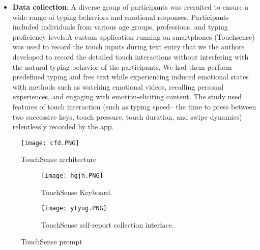 \documentclass[12pt]{article} %
\begin{document}
\begin{itemize}
    \item \textbf{Data collection}:
    A diverse group of participants was recruited to ensure a wide range of typing behaviors and emotional responses. Participants included individuals from various age groups, professions, and typing proficiency levels.A custom application running on smartphones (Touchsense) was used to record the touch inputs during text entry that we the authors developed to record the detailed touch interactions without interfering with the natural typing behavior of the participants. We had them perform predefined typing and free text while experiencing induced emotional states with methods such as watching emotional videos, recalling personal experiences, and engaging with emotion-eliciting content. The study used features of touch interaction (such as typing speed-- the time to press between two successive keys, touch pressure, touch duration, and swipe dynamics) relentlessly recorded by the app.
\end{itemize}


    \begin{figure}[h!]
    \centering
    \texttt{[image: cfd.PNG]}                    
    \caption{TouchSense architecture }                              
    \label{TouchSensearchitecture}
    \end{figure}                                                                                                
  
 \begin{figure}[h!]
    \centering
    \begin{subfigure}[b]{0.45\textwidth}
        \centering
        \texttt{[image: hgjh.PNG]}
        \caption{TouchSense Keyboard.}
        \label{fig: TouchSense Keyboard.}                    
    \end{subfigure}
    \hfill                                         
  
    \begin{subfigure}[b]{0.45\textwidth}
        \centering
        \texttt{[image: ytyug.PNG]}
        \caption{TouchSense self-report collection interface.}
        \label{fig: TouchSense self-report collection interface.}
    \end{subfigure}
    \caption{TouchSense prompt}
    \label{fig:architectures}
\end{figure}                    
                      
\end{document}
